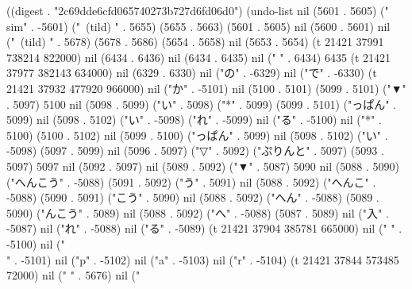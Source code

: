 
((digest . "2c69dde6cfd065740273b727d6fd06d0") (undo-list nil (5601 . 5605) ("\\sim" . -5601) ("~(tild)
" . 5655) (5655 . 5663) (5601 . 5605) nil (5600 . 5601) nil ("~(tild)
" . 5678) (5678 . 5686) (5654 . 5658) nil (5653 . 5654) (t 21421 37991 738214 822000) nil (6434 . 6436) nil (6434 . 6435) nil (" " . 6434) 6435 (t 21421 37977 382143 634000) nil (6329 . 6330) nil ("の" . -6329) nil ("で" . -6330) (t 21421 37932 477920 966000) nil ("か" . -5101) nil (5100 . 5101) (5099 . 5101) ("▼" . 5097) 5100 nil (5098 . 5099) ("い" . 5098) ("*" . 5099) (5099 . 5101) ("っぱん" . 5099) nil (5098 . 5102) ("い" . -5098) ("れ" . -5099) nil ("る" . -5100) nil ("*" . 5100) (5100 . 5102) nil (5099 . 5100) ("っぱん" . 5099) nil (5098 . 5102) ("い" . -5098) (5097 . 5099) nil (5096 . 5097) ("▽" . 5092) ("ぷりんと" . 5097) (5093 . 5097) 5097 nil (5092 . 5097) nil (5089 . 5092) ("▼" . 5087) 5090 nil (5088 . 5090) ("へんこう" . -5088) (5091 . 5092) ("う" . 5091) nil (5088 . 5092) ("へんこ" . -5088) (5090 . 5091) ("こう" . 5090) nil (5088 . 5092) ("へん" . -5088) (5089 . 5090) ("んこう" . 5089) nil (5088 . 5092) ("へ" . -5088) (5087 . 5089) nil ("入" . -5087) nil ("れ" . -5088) nil ("る" . -5089) (t 21421 37904 385781 665000) nil ("
" . -5100) nil ("\\" . -5101) nil ("p" . -5102) nil ("a" . -5103) nil ("r" . -5104) (t 21421 37844 573485 72000) nil ("
" . 5676) nil ("
